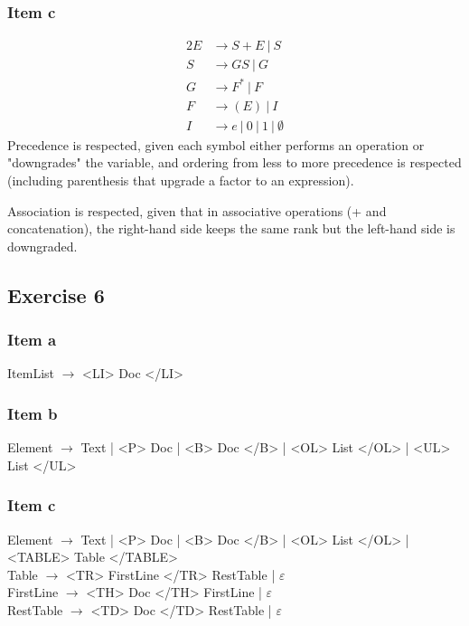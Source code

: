 {\subsubsection{Item c}
\begin{alignat*}{2}
	E &\rightarrow S+E~|~S \\
	S &\rightarrow GS~|~G \\
	G &\rightarrow F^*~|~F \\
	F &\rightarrow (E)~|~I \\
	I &\rightarrow e~|~0~|~1~|~\emptyset
\end{alignat*}
Precedence is respected, given each symbol either performs an operation or "downgrades" the variable, and ordering from less to more precedence is respected (including parenthesis that upgrade a factor to an expression).\par
Association is respected, given that in associative operations (+ and concatenation), the right-hand side keeps the same rank but the left-hand side is downgraded.
\subsection{Exercise 6}
\subsubsection{Item a}
ItemList $\rightarrow$ <LI> Doc </LI>
\subsubsection{Item b}
Element $\rightarrow$ Text | <P> Doc | <B> Doc </B> | <OL> List </OL> | <UL> List </UL>
\subsubsection{Item c}
Element $\rightarrow$ Text | <P> Doc | <B> Doc </B> | <OL> List </OL> | <TABLE> Table </TABLE>\\
Table $\rightarrow$ <TR> FirstLine </TR> RestTable | $\varepsilon$\\
FirstLine $\rightarrow$ <TH> Doc </TH> FirstLine | $\varepsilon$\\
RestTable $\rightarrow$ <TD> Doc </TD> RestTable | $\varepsilon$
}

